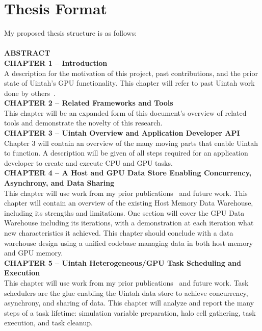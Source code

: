 \documentclass[12pt]{article}
\begin{document}
\section{Thesis Format}
\label{ch:thesis_format}

My proposed thesis structure is as follows:\\
\\
\textbf{ABSTRACT}\\
\textbf{CHAPTER 1 – Introduction}\\
A description for the motivation of this project, past contributions, and the prior state of Uintah's GPU functionality. This chapter will refer to past Uintah work done by others~\cite{wolfhpc12, meng-dissertation}.\\  
\textbf{CHAPTER 2 – Related Frameworks and Tools}\\
This chapter will be an expanded form of this document's overview of related tools and demonstrate the novelty of this research.\\  
\textbf{CHAPTER 3 – Uintah Overview and Application Developer API}\\
Chapter 3 will contain an overview of the many moving parts that enable Uintah to function.  A description will be given of all steps required for an application developer to create and execute CPU and GPU tasks.  \\  
\textbf{CHAPTER 4 -- A Host and GPU Data Store Enabling Concurrency, Asynchrony, and Data Sharing}\\ 
This chapter will use work from my prior publications~\cite{wolfhpc15,ijpp16,espm2-brad} and future work.  This chapter will contain an overview of the existing Host Memory Data Warehouse, including its strengths and limitations.  One section will cover the GPU Data Warehouse including its iterations, with a demonstration at each iteration what new characteristics it achieved.  This chapter should conclude with a data warehouse design using a unified codebase managing data in both host memory and GPU memory.\\  
\textbf{CHAPTER 5 – Uintah Heterogeneous/GPU Task Scheduling and Execution}\\
This chapter will use work from my prior publications~\cite{wolfhpc15,ijpp16,espm2-brad} and future work.  
Task schedulers are the glue enabling the Uintah data store to achieve concurrency, asynchrony, and sharing of data.  This chapter will analyze and report the many steps of a task lifetime: simulation variable preparation, halo cell gathering, task execution, and task cleanup.\\ 
\end{document}
